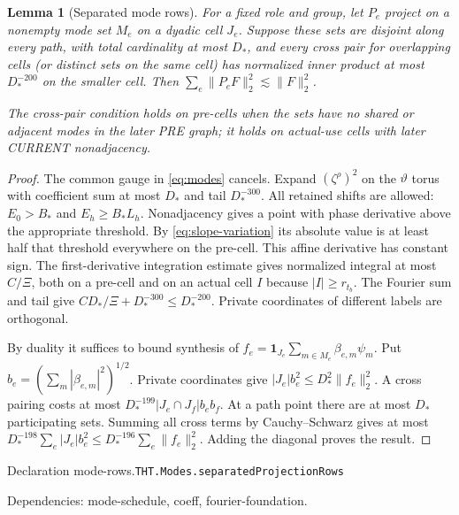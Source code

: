\documentclass[11pt]{article}
\newtheorem{lemma}[theorem]{Lemma}
\theoremstyle{definition}
\newcommand{\one}{\mathbf 1}
\numberwithin{equation}{section}
\newcommand{\bp}[3]{\par\smallskip\begingroup\footnotesize
\noindent\hypertarget{bp:#1}{\textsf{Declaration #1.}}\quad\nolinkurl{#2}\par
\noindent\textsf{Dependencies:} #3.\par\endgroup\smallskip}
\begin{document}
\begin{lemma}[Separated mode rows]\label{lem:mode-rows}
For a fixed role and group, let $P_e$ project on a nonempty mode set $M_e$ on a dyadic cell $J_e$. Suppose these sets are disjoint along every path, with total cardinality at most $D_*$, and every cross pair for overlapping cells (or distinct sets on the same cell) has normalized inner product at most $D_*^{-200}$ on the smaller cell. Then $\sum_e\|P_eF\|_2^2\lesssim\|F\|_2^2$.

The cross-pair condition holds on pre-cells when the sets have no shared or adjacent modes in the later PRE graph; it holds on actual-use cells with later CURRENT nonadjacency.
\end{lemma}
\begin{proof}
The common gauge in \eqref{eq:modes} cancels. Expand $(\zeta^\rho)^2$ on the $\vartheta$ torus with coefficient sum at most $D_*$ and tail $D_*^{-300}$. All retained shifts are allowed: $E_0>B_*$ and $E_h\ge B_*L_h$. Nonadjacency gives a point with phase derivative above the appropriate threshold. By \eqref{eq:slope-variation} its absolute value is at least half that threshold everywhere on the pre-cell. This affine derivative has constant sign. The first-derivative integration estimate gives normalized integral at most $C/\Xi$, both on a pre-cell and on an actual cell $I$ because $|I|\ge r_{t_b}$. The Fourier sum and tail give $CD_*/\Xi+D_*^{-300}\le D_*^{-200}$. Private coordinates of different labels are orthogonal.

By duality it suffices to bound synthesis of $f_e=\one_{J_e}\sum_{m\in M_e}\beta_{e,m}\psi_m$. Put $b_e=(\sum_m|\beta_{e,m}|^2)^{1/2}$. Private coordinates give $|J_e|b_e^2\le D_*^2\|f_e\|_2^2$. A cross pairing costs at most $D_*^{-199}|J_e\cap J_f|b_eb_f$. At a path point there are at most $D_*$ participating sets. Summing all cross terms by Cauchy--Schwarz gives at most $D_*^{-198}\sum_e|J_e|b_e^2\le D_*^{-196}\sum_e\|f_e\|_2^2$. Adding the diagonal proves the result.
\end{proof}
\bp{mode-rows}{THT.Modes.separatedProjectionRows}{mode-schedule, coeff, fourier-foundation}
\end{document}
